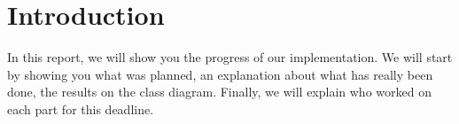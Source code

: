 \section{Introduction}

In this report, we will show you the progress of our implementation. We
will start by showing you what was planned, an explanation about what has
really been done, the results on the class diagram. Finally, we will
explain who worked on each part for this deadline.
